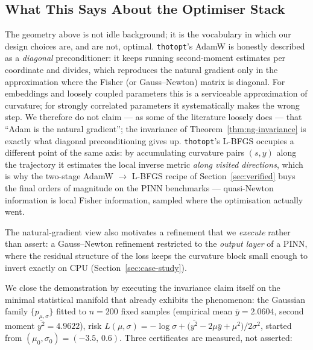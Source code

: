 \subsection{What This Says About the Optimiser Stack}
\label{sec:info-geo-thotopt}

The geometry above is not idle background; it is the vocabulary in which our
design choices are, and are not, optimal. \texttt{thotopt}'s AdamW is
honestly described as a \emph{diagonal} preconditioner: it keeps running
second-moment estimates per coordinate and divides, which reproduces the
natural gradient only in the approximation where the Fisher (or Gauss--Newton)
matrix is diagonal. For embeddings and loosely coupled parameters this is a
serviceable approximation of curvature; for strongly correlated parameters it
systematically makes the wrong step. We therefore do not claim --- as some of
the literature loosely does --- that ``Adam is the natural gradient''; the
invariance of Theorem~\ref{thm:ng-invariance} is exactly what diagonal
preconditioning gives up. \texttt{thotopt}'s L-BFGS occupies a different
point of the same axis: by accumulating curvature pairs $(s, y)$ along the
trajectory it estimates the local inverse metric \emph{along visited
directions}, which is why the two-stage AdamW $\rightarrow$ L-BFGS recipe of
Section~\ref{sec:verified} buys the final orders of magnitude on the PINN
benchmarks --- quasi-Newton information is local Fisher information, sampled
where the optimisation actually went.

The natural-gradient view also motivates a refinement that we \emph{execute}
rather than assert: a Gauss--Newton refinement restricted to the
\emph{output layer} of a PINN, where the residual structure of the loss keeps
the curvature block small enough to invert exactly on CPU
(Section~\ref{sec:case-study}).

We close the demonstration by executing the invariance claim itself on the
minimal statistical manifold that already exhibits the phenomenon: the
Gaussian family $\{p_{\mu,\sigma}\}$ fitted to $n=200$ fixed samples
(empirical mean $\bar y=2.0604$, second moment $\overline{y^{2}}=4.9622$),
risk $L(\mu,\sigma)=-\log\sigma+\bigl(\overline{y^{2}}-2\mu\bar y+\mu^{2}
\bigr)/2\sigma^{2}$, started from
$(\mu_0,\sigma_0)=(-3.5,\,0.6)$.  Three certificates are measured, not
asserted:

